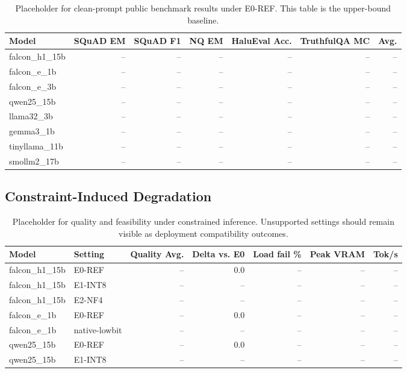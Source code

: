 \documentclass[letterpaper]{article}
\newcommand{\tbd}{--}
\begin{document}
\begin{table}[t]
\centering
\small
\begin{tabular}{lrrrrrr}
\toprule
Model & SQuAD EM & SQuAD F1 & NQ EM & HaluEval Acc. & TruthfulQA MC & Avg. \\
\midrule
falcon\_h1\_15b & \tbd & \tbd & \tbd & \tbd & \tbd & \tbd \\
falcon\_e\_1b & \tbd & \tbd & \tbd & \tbd & \tbd & \tbd \\
falcon\_e\_3b & \tbd & \tbd & \tbd & \tbd & \tbd & \tbd \\
qwen25\_15b & \tbd & \tbd & \tbd & \tbd & \tbd & \tbd \\
llama32\_3b & \tbd & \tbd & \tbd & \tbd & \tbd & \tbd \\
gemma3\_1b & \tbd & \tbd & \tbd & \tbd & \tbd & \tbd \\
tinyllama\_11b & \tbd & \tbd & \tbd & \tbd & \tbd & \tbd \\
smollm2\_17b & \tbd & \tbd & \tbd & \tbd & \tbd & \tbd \\
\bottomrule
\end{tabular}
\caption{Placeholder for clean-prompt public benchmark results under E0-REF. This table is the upper-bound baseline.}
\label{tab:clean_quality}
\end{table}

\subsection{Constraint-Induced Degradation}

\begin{table}[t]
\centering
\small
\begin{tabular}{llrrrrr}
\toprule
Model & Setting & Quality Avg. & Delta vs. E0 & Load fail \% & Peak VRAM & Tok/s \\
\midrule
falcon\_h1\_15b & E0-REF & \tbd & 0.0 & \tbd & \tbd & \tbd \\
falcon\_h1\_15b & E1-INT8 & \tbd & \tbd & \tbd & \tbd & \tbd \\
falcon\_h1\_15b & E2-NF4 & \tbd & \tbd & \tbd & \tbd & \tbd \\
falcon\_e\_1b & E0-REF & \tbd & 0.0 & \tbd & \tbd & \tbd \\
falcon\_e\_1b & native-lowbit & \tbd & \tbd & \tbd & \tbd & \tbd \\
qwen25\_15b & E0-REF & \tbd & 0.0 & \tbd & \tbd & \tbd \\
qwen25\_15b & E1-INT8 & \tbd & \tbd & \tbd & \tbd & \tbd \\
\bottomrule
\end{tabular}
\caption{Placeholder for quality and feasibility under constrained inference. Unsupported settings should remain visible as deployment compatibility outcomes.}
\label{tab:constraint_degradation}
\end{table}
\end{document}
